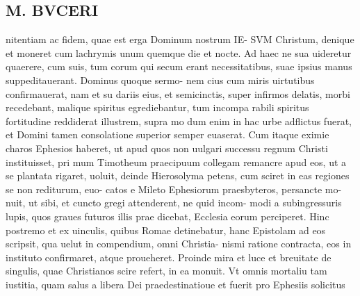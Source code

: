 \documentclass{article}
\begin{document}
\begin{pages}
\section*{M. BVCERI }\pstart nitentiam ac fidem, quae est erga Dominum nostrum IE- SVM Christum, denique et moneret cum lachrymis unum quemque die et nocte. Ad haec ne sua uideretur quaerere, cum suis, tum corum qui secum erant necessitatibus, suae ipsius manus suppeditauerant. Dominus quoque sermo- nem cius cum miris uirtutibus confirmauerat, nam et su dariis eius, et semicinctis, super infirmos delatis, morbi recedebant, malique spiritus egrediebantur, tum incompa rabili spiritus fortitudine reddiderat illustrem, supra mo dum enim in hac urbe adflictus fuerat, et Domini tamen consolatione superior semper euaserat.   \pend\pstart Cum itaque eximie charos Ephesios haberet, ut apud quos non uulgari successu regnum Christi instituisset, pri mum Timotheum praecipuum collegam remancre apud eos, ut a se plantata rigaret, uoluit, deinde Hierosolyma petens, cum sciret in eas regiones se non rediturum, euo- catos e Mileto Ephesiorum praesbyteros, persancte mo- nuit, ut sibi, et cuncto gregi attenderent, ne quid incom- modi a subingressuris lupis, quos graues futuros illis prae dicebat, Ecclesia eorum perciperet. Hinc postremo et ex uinculis, quibus Romae detinebatur, hanc Epistolam ad eos scripsit, qua uelut in compendium, omni Christia- nismi ratione contracta, eos in instituto confirmaret, atque proueheret.  \pend\pstart Proinde mira et luce et breuitate de singulis, quae Christianos scire refert, in ea monuit.  Vt omnis mortaliu tam iustitia, quam salus a libera Dei praedestinatioue et  \pendQuam fuerit pro Ephesiis solicitus 

\end{pages}
\end{document}
